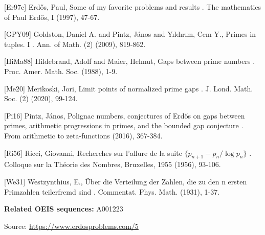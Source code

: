 \documentclass{article}
\begin{document}
[Er97c] Erd\H{o}s, Paul, Some of my favorite problems and results . The mathematics of Paul Erd\H{o}s, I (1997), 47-67.

[GPY09] Goldston, Daniel A. and Pintz, J\'{a}nos and Y\i ld\i r\i m, Cem Y., Primes in tuples. I . Ann. of Math. (2) (2009), 819-862.

[HiMa88] Hildebrand, Adolf and Maier, Helmut, Gaps between prime numbers . Proc. Amer. Math. Soc. (1988), 1-9.

[Me20] Merikoski, Jori, Limit points of normalized prime gaps . J. Lond. Math. Soc. (2) (2020), 99-124.

[Pi16] Pintz, J\'{a}nos, Polignac numbers, conjectures of Erd\H{o}s on gaps between primes, arithmetic progressions in primes, and the bounded gap conjecture . From arithmetic to zeta-functions (2016), 367-384.

[Ri56] Ricci, Giovanni, Recherches sur l'allure de la suite $\{p_{n+1}-p_n/\log p_n\}$ . Colloque sur la Th\'{e}orie des Nombres, Bruxelles, 1955 (1956), 93-106.

[We31] Westzynthius, E., \"{U}ber die Verteilung der Zahlen, die zu den n ersten Primzahlen teilerfremd sind . Commentat. Phys. Math. (1931), 1-37.

\noindent\textbf{Related OEIS sequences:} A001223


\bigskip
\noindent\small{Source: \url{https://www.erdosproblems.com/5}}
\end{document}
